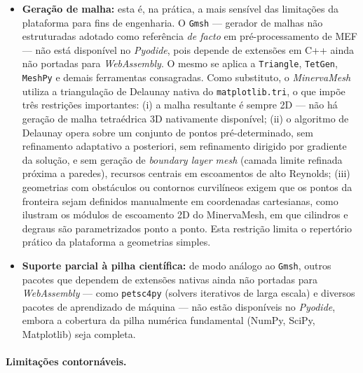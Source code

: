 \begin{itemize}
    \item \textbf{Geração de malha:} esta é, na prática, a mais sensível das limitações da plataforma para fins de engenharia. O \texttt{Gmsh} --- gerador de malhas não estruturadas adotado como referência \textit{de facto} em pré-processamento de MEF --- não está disponível no \textit{Pyodide}, pois depende de extensões em C++ ainda não portadas para \textit{WebAssembly}. O mesmo se aplica a \texttt{Triangle}, \texttt{TetGen}, \texttt{MeshPy} e demais ferramentas consagradas. Como substituto, o \textit{MinervaMesh} utiliza a triangulação de Delaunay nativa do \texttt{matplotlib.tri}, o que impõe três restrições importantes: (i) a malha resultante é sempre 2D --- não há geração de malha tetraédrica 3D nativamente disponível; (ii) o algoritmo de Delaunay opera sobre um conjunto de pontos pré-determinado, sem refinamento adaptativo a posteriori, sem refinamento dirigido por gradiente da solução, e sem geração de \textit{boundary layer mesh} (camada limite refinada próxima a paredes), recursos centrais em escoamentos de alto Reynolds; (iii) geometrias com obstáculos ou contornos curvilíneos exigem que os pontos da fronteira sejam definidos manualmente em coordenadas cartesianas, como ilustram os módulos de escoamento 2D do MinervaMesh, em que cilindros e degraus são parametrizados ponto a ponto. Esta restrição limita o repertório prático da plataforma a geometrias simples.

    \item \textbf{Suporte parcial à pilha científica:} de modo análogo ao \texttt{Gmsh}, outros pacotes que dependem de extensões nativas ainda não portadas para \textit{WebAssembly} --- como \texttt{petsc4py} (solvers iterativos de larga escala) e diversos pacotes de aprendizado de máquina --- não estão disponíveis no \textit{Pyodide}, embora a cobertura da pilha numérica fundamental (NumPy, SciPy, Matplotlib) seja completa.
\end{itemize}

\paragraph{Limitações contornáveis.}

